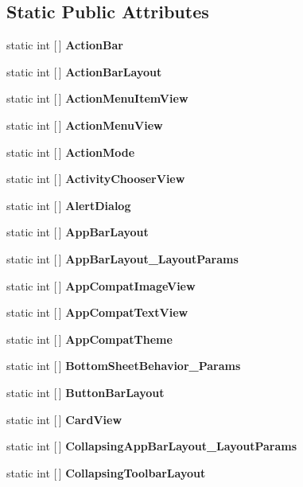 \subsection*{Static Public Attributes}
\begin{DoxyCompactItemize}
\item 
static int \mbox{[}$\,$\mbox{]} {\bfseries Action\+Bar}
\item 
static int \mbox{[}$\,$\mbox{]} {\bfseries Action\+Bar\+Layout}
\item 
static int \mbox{[}$\,$\mbox{]} {\bfseries Action\+Menu\+Item\+View}
\item 
\mbox{\label{class_pinned_app_1_1_droid_1_1_resource_1_1_styleable_a68114dfc18fbdaf7117da151770d985c}} 
static int \mbox{[}$\,$\mbox{]} {\bfseries Action\+Menu\+View}
\item 
static int \mbox{[}$\,$\mbox{]} {\bfseries Action\+Mode}
\item 
static int \mbox{[}$\,$\mbox{]} {\bfseries Activity\+Chooser\+View}
\item 
static int \mbox{[}$\,$\mbox{]} {\bfseries Alert\+Dialog}
\item 
static int \mbox{[}$\,$\mbox{]} {\bfseries App\+Bar\+Layout}
\item 
static int \mbox{[}$\,$\mbox{]} {\bfseries App\+Bar\+Layout\+\_\+\+Layout\+Params}
\item 
static int \mbox{[}$\,$\mbox{]} {\bfseries App\+Compat\+Image\+View}
\item 
static int \mbox{[}$\,$\mbox{]} {\bfseries App\+Compat\+Text\+View}
\item 
\mbox{\label{class_pinned_app_1_1_droid_1_1_resource_1_1_styleable_ae2317a0dd7327291896c6c24b93d0172}} 
static int \mbox{[}$\,$\mbox{]} {\bfseries App\+Compat\+Theme}
\item 
static int \mbox{[}$\,$\mbox{]} {\bfseries Bottom\+Sheet\+Behavior\+\_\+\+Params}
\item 
static int \mbox{[}$\,$\mbox{]} {\bfseries Button\+Bar\+Layout}
\item 
static int \mbox{[}$\,$\mbox{]} {\bfseries Card\+View}
\item 
static int \mbox{[}$\,$\mbox{]} {\bfseries Collapsing\+App\+Bar\+Layout\+\_\+\+Layout\+Params}
\item 
static int \mbox{[}$\,$\mbox{]} {\bfseries Collapsing\+Toolbar\+Layout}

\end{DoxyCompactItemize}
